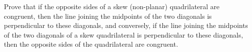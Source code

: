 Prove that if the opposite sides of a skew (non-planar) quadrilateral are congruent, then the line joining the midpoints of the two diagonals is perpendicular to these diagonals, and conversely, if the line joining the midpoints of the two diagonals of a skew quadrilateral is perpendicular to these diagonals, then the opposite sides of the quadrilateral are congruent.